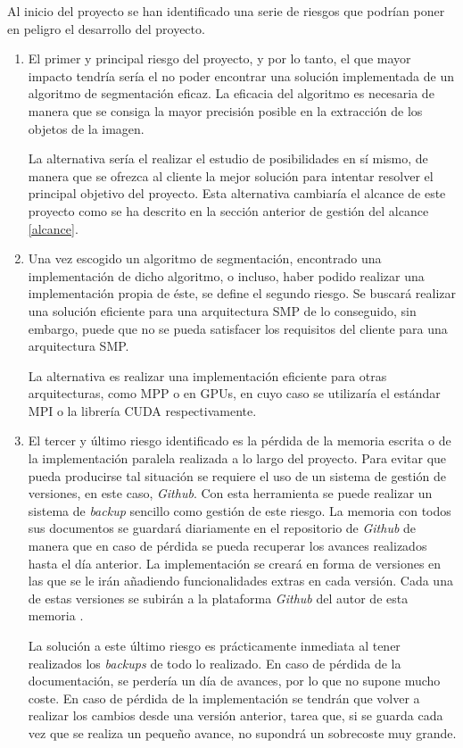 Al inicio del proyecto se han identificado una serie de riesgos que podr\'{i}an poner en peligro el desarrollo del proyecto.

\begin{enumerate}
	\item El primer y principal riesgo del proyecto, y por lo tanto, el que mayor impacto tendr\'{i}a ser\'{i}a el no poder encontrar una soluci\'{o}n implementada de un algoritmo de segmentaci\'{o}n eficaz. La eficacia del algoritmo es necesaria de manera que se consiga la mayor precisi\'{o}n posible en la extracci\'{o}n de los objetos de la imagen.
	
	La alternativa ser\'{i}a el realizar el estudio de posibilidades en s\'{i} mismo, de manera que se ofrezca al cliente la mejor soluci\'{o}n para intentar resolver el principal objetivo del proyecto. Esta alternativa cambiar\'{i}a el alcance de este proyecto como se ha descrito en la secci\'{o}n anterior de gesti\'{o}n del alcance \ref{alcance}.
	
	\item Una vez escogido un algoritmo de segmentaci\'{o}n, encontrado una implementaci\'{o}n de dicho algoritmo, o incluso, haber podido realizar una implementaci\'{o}n propia de \'{e}ste, se define el segundo riesgo. Se buscar\'{a} realizar una soluci\'{o}n eficiente para una arquitectura SMP de lo conseguido, sin embargo, puede que no se pueda satisfacer los requisitos del cliente para una arquitectura SMP.
	
	La alternativa es realizar una implementaci\'{o}n eficiente para otras arquitecturas, como MPP o en GPUs, en cuyo caso se utilizar\'{i}a el est\'{a}ndar MPI o la librer\'{i}a CUDA respectivamente.
	
	\item El tercer y \'{u}ltimo riesgo identificado es la p\'{e}rdida de la memoria escrita o de la implementaci\'{o}n paralela realizada a lo largo del proyecto. Para evitar que pueda producirse tal situaci\'{o}n se requiere el uso de un sistema de gesti\'{o}n de versiones, en este caso, \textit{Github}. Con esta herramienta se puede realizar un sistema de \textit{backup} sencillo como gesti\'{o}n de este riesgo. La memoria con todos sus documentos se guardar\'{a} diariamente en el repositorio de \textit{Github} de manera que en caso de p\'{e}rdida se pueda recuperar los avances realizados hasta el d\'{i}a anterior. La implementaci\'{o}n se crear\'{a} en forma de versiones en las que se le ir\'{a}n a\~{n}adiendo funcionalidades extras en cada versi\'{o}n. Cada una de estas versiones se subir\'{a}n a la plataforma \textit{Github} del autor de esta memoria \cite{gitHub1}. 
	
	La soluci\'{o}n a este \'{u}ltimo riesgo es pr\'{a}cticamente inmediata al tener realizados los \textit{backups} de todo lo realizado. En caso de p\'{e}rdida de la documentaci\'{o}n, se perder\'{i}a un d\'{i}a de avances, por lo que no supone mucho coste. En caso de p\'{e}rdida de la implementaci\'{o}n se tendr\'{a}n que volver a realizar los cambios desde una versi\'{o}n anterior, tarea que, si se guarda cada vez que se realiza un peque\~{n}o avance, no supondr\'{a} un sobrecoste muy grande.
	
\end{enumerate}